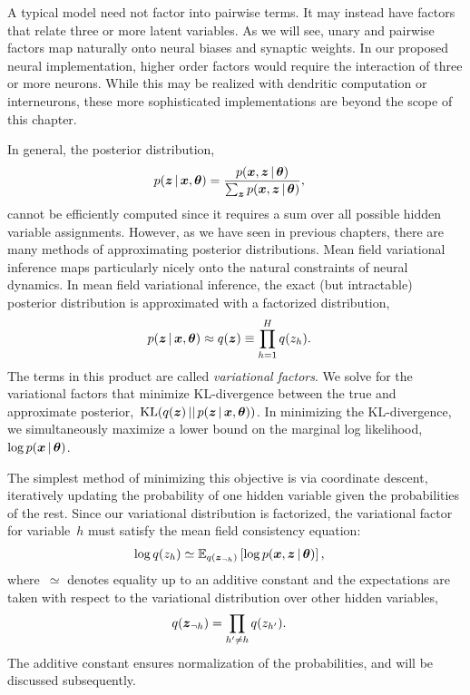 A typical model need not factor into pairwise terms. It may instead
have factors that relate three or more latent variables. As we will
see, unary and pairwise factors map naturally onto neural biases
and synaptic weights. In our proposed neural implementation, higher
order factors would require the interaction of three or more neurons.
While this may be realized with dendritic computation or interneurons,
these more sophisticated implementations are beyond the scope of this
chapter. 

In general, the posterior distribution,
\begin{align}
  p(\boldsymbol{z} \,|\, \boldsymbol{x}, \boldsymbol{\theta}) &=
  \frac{p(\boldsymbol{x}, \boldsymbol{z} \,|\, \boldsymbol{\theta})}
       {\sum_{\boldsymbol{z}} p(\boldsymbol{x}, \boldsymbol{z} \,|\, \boldsymbol{\theta})},
\end{align}
cannot be efficiently computed since it requires a sum over all
possible hidden variable assignments.
However, as we have seen in previous chapters, there are many methods of
approximating posterior distributions. Mean field variational
inference  maps particularly nicely onto the natural constraints
of neural dynamics. 
In mean field variational inference, the exact (but intractable)
posterior distribution is approximated with a factorized
distribution,
\begin{align}
  p(\boldsymbol{z} \,|\, \boldsymbol{x}, \boldsymbol{\theta}) &\approx q(\boldsymbol{z}) \equiv \prod_{h=1}^H q(z_h).
\end{align}
The terms in this product are called \emph{variational factors}.  We
solve for the variational factors that minimize KL-divergence between
the true and approximate posterior,~$\mathrm{KL}(q(\boldsymbol{z}) \,||\, p(\boldsymbol{z}
\,|\, \boldsymbol{x}, \boldsymbol{\theta}))$. In minimizing the KL-divergence, we
simultaneously maximize a lower bound on the marginal log
likelihood,~$\log p(\boldsymbol{x} \,|\, \boldsymbol{\theta})$.

The simplest method of minimizing this objective is via coordinate
descent, iteratively updating the probability of one hidden variable
given the probabilities of the rest. Since our variational
distribution is factorized, the variational factor for variable~$h$
must satisfy the mean field consistency equation:
\begin{align}
  \label{eq:mf_consistency}
  \log q(z_h) &\simeq \mathbb{E}_{q(\boldsymbol{z}_{\neg h})}
  \left[ \log p(\boldsymbol{x}, \boldsymbol{z} \,|\, \boldsymbol{\theta}) \right],
\end{align}
where~$\simeq$ denotes equality up to an additive constant and the
expectations are taken with respect to the variational
distribution over other hidden variables,
\begin{align}
  q(\boldsymbol{z}_{\neg h}) &= \prod_{h' \neq h} q(z_{h'}).
\end{align}
The additive constant
ensures normalization of the probabilities, and will be discussed
subsequently.  

